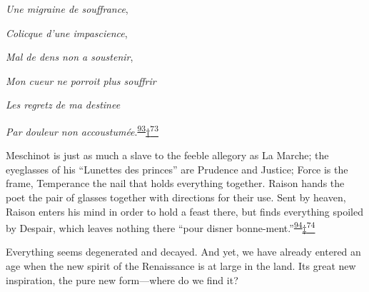 \emph{Une migraine de souffrance},

\emph{Colicque d'une impascience},

\emph{Mal de dens non a soustenir},

\emph{Mon cueur ne porroit plus souffrir}

\emph{Les regretz de ma destinee}

\emph{Par douleur non
accoustumée}.\textsuperscript{\protect\hypertarget{21_Chapter_Thirteen__IMAGE_AND_WORD.xhtmlux5cux23id_126}{\protect\hyperlink{23_NOTES.xhtmlux5cux23id_127}{93}}}\protect\hypertarget{21_Chapter_Thirteen__IMAGE_AND_WORD.xhtmlux5cux23id_2807}{\protect\hyperlink{23_NOTES.xhtmlux5cux23id_2808}{†\textsuperscript{73}}}

Meschinot is just as much a slave to the feeble allegory as La Marche;
the eyeglasses of his ``Lunettes des princes'' are Prudence and Justice;
Force is the frame, Temperance the nail that holds everything together.
Raison hands the poet the pair of glasses together with directions for
their use. Sent by heaven, Raison enters his mind in order to hold a
feast there, but finds everything spoiled by Despair, which leaves
nothing there ``pour disner
bonne-ment.''\textsuperscript{\protect\hypertarget{21_Chapter_Thirteen__IMAGE_AND_WORD.xhtmlux5cux23id_124}{\protect\hyperlink{23_NOTES.xhtmlux5cux23id_125}{94}}}\protect\hypertarget{21_Chapter_Thirteen__IMAGE_AND_WORD.xhtmlux5cux23id_2805}{\protect\hyperlink{23_NOTES.xhtmlux5cux23id_2806}{‡\textsuperscript{74}}}

Everything seems degenerated and decayed. And yet, we have already
entered an age when the new spirit of the Renaissance is at large in the
land. Its great new inspiration, the pure new form---where do we find
it?

